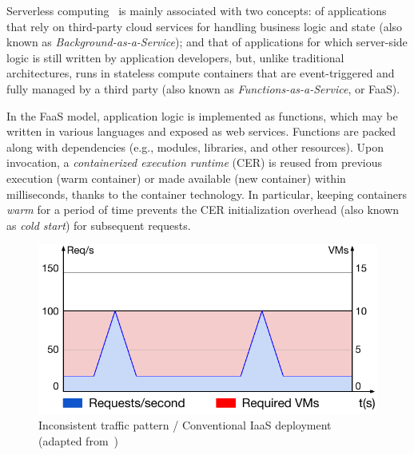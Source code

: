 
Serverless computing~\cite{Lloyd18serverless,Roberts:2018} is mainly associated with two concepts: of applications that rely on third-party cloud services for handling business logic and state (also known as \textit{Background-as-a-Service}); and that of applications for which server-side logic is still written by application developers, but, unlike traditional architectures, runs in stateless compute containers that are event-triggered
and fully managed by a third party (also known as \textit{Functions-as-a-Service}, or FaaS).

In the FaaS model, application logic is implemented as functions, which may be written in various languages and exposed as web services. Functions are packed along with dependencies (e.g., modules, libraries, and other resources). Upon invocation, a \textit{containerized execution runtime} (CER) is reused from previous execution (warm container) or made available (new container) within milliseconds, thanks to the container technology. In particular, keeping containers \textit{warm} for a period of time prevents the CER initialization overhead (also known as \textit{cold start}) for subsequent requests. 





\begin{figure}[tbp]
	\centering
	\includegraphics[width=0.9\linewidth]{Figs/IaaS_vs_FaaS}
	\caption{Inconsistent traffic pattern / Conventional IaaS deployment (adapted from~\cite{Roberts:2018})}
	\label{fig:IaaS_vs_FaaS}
\end{figure}

